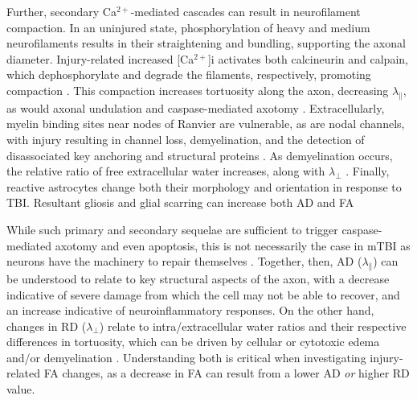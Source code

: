 \documentclass[12pt]{article}
\begin{document}
Further, secondary Ca$^{2+}$-mediated cascades can result in neurofilament compaction. In an uninjured state, phosphorylation of heavy and medium neurofilaments results in their straightening and bundling, supporting the axonal diameter. Injury-related increased [Ca$^{2+}$]i activates both calcineurin and calpain, which dephosphorylate and degrade the filaments, respectively, promoting compaction \parencite{krieg2023IdentifyingPhenotypesDiffuse,pant1988DephosphorylationNeurofilamentProteins,chen1999EvolutionNeurofilamentSubtype}. This compaction increases tortuosity along the axon, decreasing $\lambda_\parallel$, as would axonal undulation and caspase-mediated axotomy \parencite{svandova2023MakingHeadCaspases}. Extracellularly, myelin binding sites near nodes of Ranvier are vulnerable, as are nodal channels, with injury resulting in channel loss, demyelination, and the detection of disassociated key anchoring and structural proteins \parencite{song2022ConcussionLeadsWidespread,zhu2016NodalTotalAxonal,krieg2023IdentifyingPhenotypesDiffuse}. As demyelination occurs, the relative ratio of free extracellular water increases, along with $\lambda_\perp$ \parencite{mayer2010ProspectiveDiffusionTensor,winklewski2018UnderstandingPhysiopathologyAxial}. Finally, reactive astrocytes change both their morphology and orientation in response to TBI. Resultant gliosis and glial scarring can increase both AD and FA \parencite{budde2011ContributionGliosisDiffusion,churchill2017WhiteMatterMicrostructure,cieri2025AstrocytesReactiveAstrogliosis,mira2021TraumaticBrainInjury,sofroniew2009MolecularDissectionReactive}

While such primary and secondary sequelae are sufficient to trigger caspase-mediated axotomy and even apoptosis, this is not necessarily the case in mTBI as neurons have the machinery to repair themselves \parencite{franze2013MechanicsNeuronalDevelopment,sakai2019InflammationNeuralRepair}. Together, then, AD ($\lambda_\parallel$) can be understood to relate to key structural aspects of the axon, with a decrease indicative of severe damage from which the cell may not be able to recover, and an increase indicative of neuroinflammatory responses. On the other hand, changes in RD ($\lambda_\perp$) relate to intra/extracellular water ratios and their respective differences in tortuosity, which can be driven by cellular or cytotoxic edema and/or demyelination \parencite{borja2018DiffusionMRImaging,mayer2017SpectrumMildTraumatic,lindsey2023DiffusionWeightedImagingMild}. Understanding both is critical when investigating injury-related FA changes, as a decrease in FA can result from a lower AD \textit{or} higher RD value.
\end{document}
